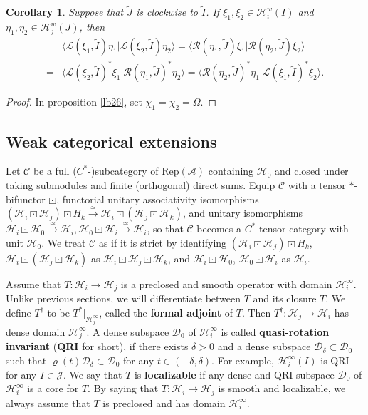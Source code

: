 \documentclass[12pt,a4paper]{article}
\theoremstyle{definition}
\theoremstyle{plain}
\newtheorem{co}[df]{Corollary}
\newcommand{\mc}{\mathcal}
\newcommand{\wtd}{\widetilde}
\newcommand{\ovl}{\overline}
\newcommand{\Rep}{\mathrm{Rep}}
\newcommand{\Dom}{\scr D}
\newcommand{\bk}[1]{\langle {#1}\rangle}
\newcommand{\scr}{\mathscr}
\numberwithin{equation}{subsection}
\begin{document}
\begin{co}\label{lb5}
	Suppose that $\wtd J$ is clockwise to $\wtd I$. If $\xi_1,\xi_2\in\mc H_i^w(I)$ and $\eta_1,\eta_2\in\mc H_j^w(J)$, then 
	\begin{align}
	&\bk{\scr L(\xi_1,\wtd I)\eta_1|\scr L(\xi_2,\wtd I)\eta_2 }=\bk{\scr R(\eta_1,\wtd J)\xi_1|\scr R(\eta_2,\wtd J)\xi_2}\nonumber\\
	=&\bk{\scr L(\xi_2,\wtd I)^*\xi_1|\scr R(\eta_1,\wtd J)^*\eta_2}=\bk{\scr R(\eta_2,\wtd J)^*\eta_1|\scr L(\xi_1,\wtd I)^*\xi_2}.\label{eq6}
	\end{align}
\end{co}

\begin{proof}
In proposition \ref{lb26}, set $\chi_1=\chi_2=\Omega$.
\end{proof}






\subsection{Weak categorical extensions}\label{lb33}

Let $\scr C$ be a full ($C^*$-)subcategory of $\Rep(\mc A)$ containing $\mc H_0$ and closed under taking submodules and finite (orthogonal) direct sums. %
Equip $\scr C$  with a tensor $*$-bifunctor $\boxdot$, functorial unitary associativity isomorphisms $(\mc H_i\boxdot\mc H_j)\boxdot H_k\xrightarrow\simeq\mc H_i\boxdot(\mc H_j\boxdot\mc H_k)$, and unitary isomorphisms $\mc H_i\boxdot\mc H_0\xrightarrow\simeq\mc H_i,\mc H_0\boxdot\mc H_i\xrightarrow\simeq \mc H_i$, so that $\scr C$ becomes a $C^*$-tensor category with unit $\mc H_0$. We treat $\scr C$ as if it is strict by identifying $(\mc H_i\boxdot\mc H_j)\boxdot H_k$, $\mc H_i\boxdot(\mc H_j\boxdot\mc H_k)$ as $\mc H_i\boxdot\mc H_j\boxdot \mc H_k$, and $\mc H_i\boxdot \mc H_0$, $\mc H_0\boxdot\mc H_i$ as $\mc H_i$. 



Assume that $T:\mc H_i\rightarrow\mc H_j$ is a preclosed and smooth operator with domain $\mc H_i^\infty$. Unlike previous sections, we will differentiate between $T$  and its closure $\ovl T$. We define $T^\dagger$ to be $T^*|_{\mc H_j^\infty}$,  called the \textbf{formal adjoint} of $T$. Then $T^\dagger:\mc H_j\rightarrow\mc H_i$ has  dense domain $\mc H_j^\infty$. A dense subspace $\Dom_0$ of $\mc H_i^\infty$ is called \textbf{quasi-rotation invariant} (\textbf{QRI} for short), if there exists $\delta>0$ and a dense subspace $\Dom_\delta\subset\Dom_0$ such that $\varrho(t)\Dom_\delta\subset\Dom_0$ for any $t\in(-\delta,\delta)$. For example, $\mc H_i^\infty(I)$ is QRI for any $I\in\mc J$. We say that $T$ is \textbf{localizable} if any dense and QRI subspace $\Dom_0$ of $\mc H_i^\infty$ is a core for $T$. By saying that $T:\mc H_i\rightarrow\mc H_j$ is smooth and localizable, we always assume that $T$ is preclosed and has domain $\mc H_i^\infty$.
\end{document}

